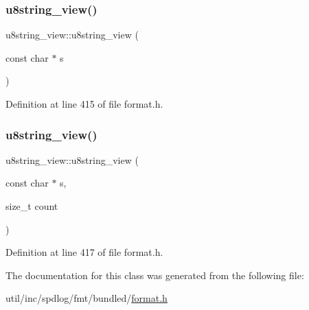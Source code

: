 \subsubsection{\texorpdfstring{u8string\+\_\+view()}{u8string\_view()}\hspace{0.1cm}{\footnotesize\ttfamily [1/2]}}
{\footnotesize\ttfamily u8string\+\_\+view\+::u8string\+\_\+view (\begin{DoxyParamCaption}\item[{const char $\ast$}]{s }\end{DoxyParamCaption})\hspace{0.3cm}{\ttfamily [inline]}}



Definition at line 415 of file format.\+h.

\mbox{\label{classu8string__view_a29121b197fae2d1b2e373cdf66f99c48}} 
\subsubsection{\texorpdfstring{u8string\+\_\+view()}{u8string\_view()}\hspace{0.1cm}{\footnotesize\ttfamily [2/2]}}
{\footnotesize\ttfamily u8string\+\_\+view\+::u8string\+\_\+view (\begin{DoxyParamCaption}\item[{const char $\ast$}]{s,  }\item[{size\+\_\+t}]{count }\end{DoxyParamCaption})\hspace{0.3cm}{\ttfamily [inline]}}



Definition at line 417 of file format.\+h.



The documentation for this class was generated from the following file\+:\begin{DoxyCompactItemize}
\item 
util/inc/spdlog/fmt/bundled/\hyperlink{format_8h}{format.\+h}\end{DoxyCompactItemize}
